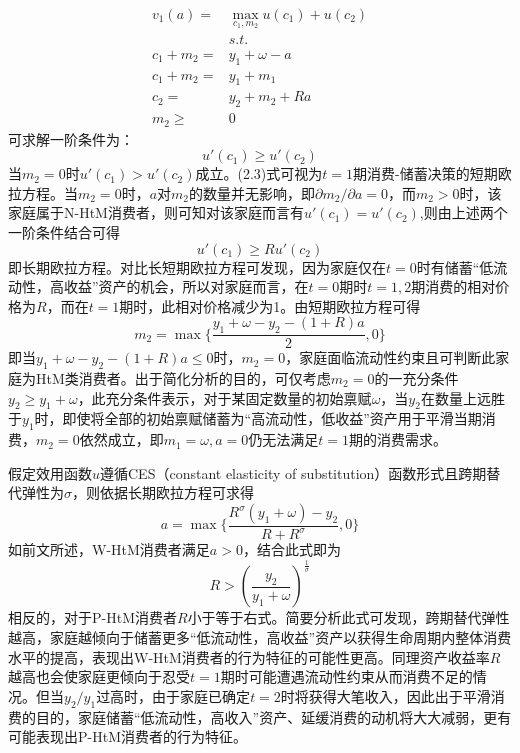 \documentclass[supercite]{HustGraduPaper}
\begin{document}
    \begin{align*} 
    v_1(a)= & \max_{c_1,m_2} u(c_1)+u(c_2)\\
    & s.t.\\
    c_1+m_2= & y_1+\omega-a\\
    c_1+m_2= & y_1+m_1\\
    c_2= & y_2+m_2+Ra\\
    m_2 \geq & 0
    \end{align*}
    可求解一阶条件为：
    \begin{equation}
    u'(c_1) \geq u'(c_2)
    \end{equation}
    当$m_2=0$时$u'(c_1)>u'(c_2)$成立。(2.3)式可视为$t=1$期消费-储蓄决策的短期欧拉方程。当$m_2=0$时，$a$对$m_2$的数量并无影响，即${\partial m_2}/{\partial a} = 0$，而$m_2>0$时，该家庭属于N-HtM消费者，则可知对该家庭而言有$u'(c_1)=u'(c_2)$,则由上述两个一阶条件结合可得
    \begin{equation}
    u'(c_1) \geq Ru'(c_2)
    \end{equation}
    即长期欧拉方程。对比长短期欧拉方程可发现，因为家庭仅在$t=0$时有储蓄“低流动性，高收益”资产的机会，所以对家庭而言，在$t=0$期时$t=1,2$期消费的相对价格为$R$，而在$t=1$期时，此相对价格减少为1。由短期欧拉方程可得
    \begin{equation}
    m_2=\max \lbrace \frac{y_1+\omega-y_2-(1+R)a}{2},0 \rbrace
    \end{equation}
    即当$y_1+\omega-y_2-(1+R)a \leq 0$时，$m_2=0$，家庭面临流动性约束且可判断此家庭为HtM类消费者。出于简化分析的目的，可仅考虑$m_2=0$的一充分条件$y_2 \geq y_1+\omega$，此充分条件表示，对于某固定数量的初始禀赋$\omega$，当$y_2$在数量上远胜于$y_1$时，即使将全部的初始禀赋储蓄为“高流动性，低收益”资产用于平滑当期消费，$m_2=0$依然成立，即$m_1=\omega,a=0$仍无法满足$t=1$期的消费需求。

    假定效用函数$u$遵循CES（constant elasticity of substitution）函数形式且跨期替代弹性为$\sigma$，则依据长期欧拉方程可求得
    \begin{equation}
    a=\max \lbrace \frac{R^\sigma (y_1+\omega)-y_2}{R+R^\sigma},0 \rbrace
    \end{equation}
    如前文所述，W-HtM消费者满足$a>0$，结合此式即为
    \begin{equation}
    R>(\frac{y_2}{y_1+\omega})^\frac{1}{\sigma}
    \end{equation}
    相反的，对于P-HtM消费者$R$小于等于右式。简要分析此式可发现，跨期替代弹性越高，家庭越倾向于储蓄更多“低流动性，高收益”资产以获得生命周期内整体消费水平的提高，表现出W-HtM消费者的行为特征的可能性更高。同理资产收益率$R$越高也会使家庭更倾向于忍受$t=1$期时可能遭遇流动性约束从而消费不足的情况。但当$y_2/y_1$过高时，由于家庭已确定$t=2$时将获得大笔收入，因此出于平滑消费的目的，家庭储蓄“低流动性，高收入”资产、延缓消费的动机将大大减弱，更有可能表现出P-HtM消费者的行为特征。
    
\end{document}
